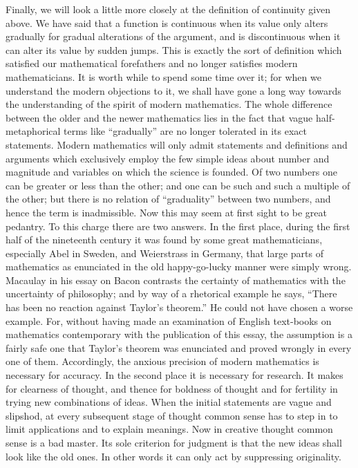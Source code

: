 \documentclass[12pt,leqno]{book}[2005/09/16]
\newcommand{\PageSep}[1]{\ignorespaces}
\begin{document}
Finally, we will look a little more closely
at the definition of continuity given above.
We have said that a function is continuous
when its value only alters gradually for
gradual alterations of the argument, and is
discontinuous when it can alter its value by
sudden jumps. This is exactly the sort of
definition which satisfied our mathematical
forefathers and no longer satisfies modern
mathematicians. It is worth while to spend
some time over it; for when we understand
the modern objections to it, we shall have
gone a long way towards the understanding
of the spirit of modern mathematics. The
\PageSep{156}
whole difference between the older and the
newer mathematics lies in the fact that vague
half-metaphorical terms like ``gradually''
are no longer tolerated in its exact statements.
Modern mathematics will only admit statements
and definitions and arguments which
exclusively employ the few simple ideas about
number and magnitude and variables on
which the science is founded. Of two numbers
one can be greater or less than the
other; and one can be such and such a multiple
of the other; but there is no relation of
``graduality'' between two numbers, and
hence the term is inadmissible. Now this
may seem at first sight to be great pedantry.
To this charge there are two answers. In
the first place, during the first half of the
nineteenth century it was found by some
great mathematicians, especially Abel in
%
Sweden, and Weierstrass in Germany, that
%
large parts of mathematics as enunciated in
the old happy-go-lucky manner were simply
wrong. Macaulay in his essay on Bacon
%
%
contrasts the certainty of mathematics with
the uncertainty of philosophy; and by way
of a rhetorical example he says, ``There has
been no reaction against Taylor's theorem.''
%
He could not have chosen a worse example.
For, without having made an examination of
English text-books on mathematics contemporary
with the publication of this essay, the
\PageSep{157}
%
assumption is a fairly safe one that Taylor's
theorem was enunciated and proved wrongly
in every one of them. Accordingly, the
anxious precision of modern mathematics is
necessary for accuracy. In the second place
it is necessary for research. It makes for
clearness of thought, and thence for boldness
of thought and for fertility in trying new
combinations of ideas. When the initial
statements are vague and slipshod, at every
subsequent stage of thought common sense
has to step in to limit applications and to
explain meanings. Now in creative thought
common sense is a bad master. Its sole
criterion for judgment is that the new ideas
shall look like the old ones. In other words
it can only act by suppressing originality.
\end{document}
